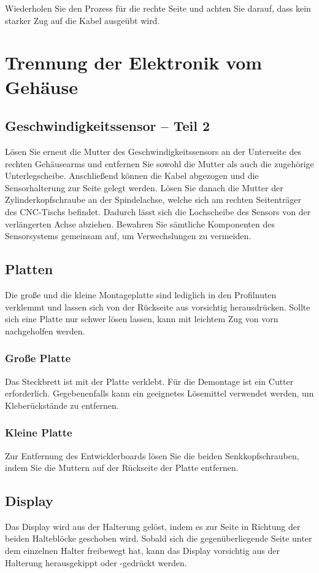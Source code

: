 Wiederholen Sie den Prozess für die rechte Seite und achten Sie darauf, dass kein starker Zug auf die Kabel ausgeübt wird.

\chapter {Trennung der Elektronik vom Gehäuse}

\section{Geschwindigkeitssensor – Teil 2}
Lösen Sie erneut die Mutter des Geschwindigkeitssensors an der Unterseite des rechten Gehäusearms und entfernen Sie sowohl die Mutter als auch die zugehörige Unterlegscheibe. Anschließend können die Kabel abgezogen und die Sensorhalterung zur Seite gelegt werden.
Lösen Sie danach die Mutter der Zylinderkopfschraube an der Spindelachse, welche sich am rechten Seitenträger des CNC-Tischs befindet. Dadurch lässt sich die Lochscheibe des Sensors von der verlängerten Achse abziehen. Bewahren Sie sämtliche Komponenten des Sensorsystems gemeinsam auf, um Verwechslungen zu vermeiden.

\section{Platten}
Die große und die kleine Montageplatte sind lediglich in den Profilnuten verklemmt und lassen sich von der Rückseite aus vorsichtig herausdrücken. Sollte sich eine Platte nur schwer lösen lassen, kann mit leichtem Zug von vorn nachgeholfen werden.

\subsection{Große Platte}
Das Steckbrett ist mit der Platte verklebt. Für die Demontage ist ein Cutter erforderlich. Gegebenenfalls kann ein geeignetes Lösemittel verwendet werden, um Kleberückstände zu entfernen.

\subsection{Kleine Platte}
Zur Entfernung des Entwicklerboards lösen Sie die beiden Senkkopfschrauben, indem Sie die Muttern auf der Rückseite der Platte entfernen.

\section{Display}
Das Display wird aus der Halterung gelöst, indem es zur Seite in Richtung der beiden Halteblöcke geschoben wird. Sobald sich die gegenüberliegende Seite unter dem einzelnen Halter freibewegt hat, kann das Display vorsichtig aus der Halterung herausgekippt oder -gedrückt werden.

